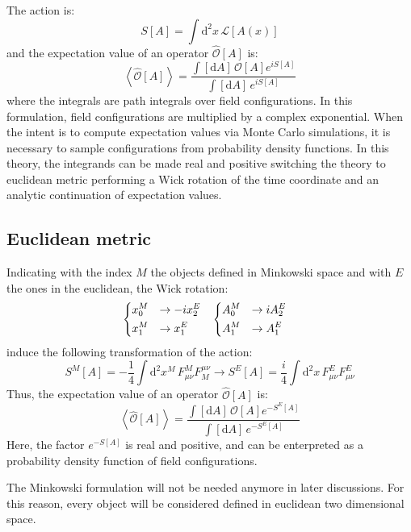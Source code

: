 The action is: \[ S[A] = \int \mathrm d^2x\, \mathcal L[A(x)] \] and the expectation value of an operator $\widehat{\mathcal O}[A]$ is:
\[
    \left< \widehat{\mathcal O}[A] \right> = \frac{\int[\mathrm dA]\, \mathcal O[A] e^{iS[A]}}{\int[\mathrm dA]\,e^{iS[A]}}
\]
where the integrals are path integrals over field configurations.
In this formulation, field configurations are multiplied by a complex exponential.
When the intent is to compute expectation values via Monte Carlo simulations,
it is necessary to sample configurations from probability density functions.
In this theory, the integrands can be made real and positive switching the theory to euclidean metric performing a Wick rotation of the time coordinate and an analytic continuation of expectation values.

\subsection*{Euclidean metric}

Indicating with the index $M$ the objects defined in Minkowski space and with $E$ the ones in the euclidean, the Wick rotation:
\begin{align*}
    &\begin{dcases}
        x^M_0 &\rightarrow -i x^E_2 \\
        x^M_1 &\rightarrow x^E_1
    \end{dcases}%
    &%
    \begin{dcases}
        A^M_0 &\rightarrow i A^E_2 \\
        A^M_1 &\rightarrow A^E_1 
    \end{dcases}&
\end{align*}
induce the following transformation of the action:
\[
    S^M[A] = -\frac{1}{4}\int\mathrm d^2x^M\,F^M_{\mu\nu}F_M^{\mu\nu} \rightarrow  S^E[A] = \frac{i}{4}\int\mathrm d^2x\,F^E_{\mu\nu}F^E_{\mu\nu}
\]
Thus, the expectation value of an operator $\widehat{\mathcal O}[A]$ is:
\begin{equation}\label{eq:cont_exp}
    \left< \widehat{\mathcal O}[A] \right> = \frac{\int[\mathrm dA]\, \mathcal O[A] e^{-S^E[A]}}{\int[\mathrm dA]\,e^{-S^E[A]}}
\end{equation}
Here, the factor $e^{-S[A]}$ is real and positive, and can be enterpreted as a probability density function of field configurations.

The Minkowski formulation will not be needed anymore in later discussions.
For this reason, every object will be considered defined in euclidean two dimensional space.

